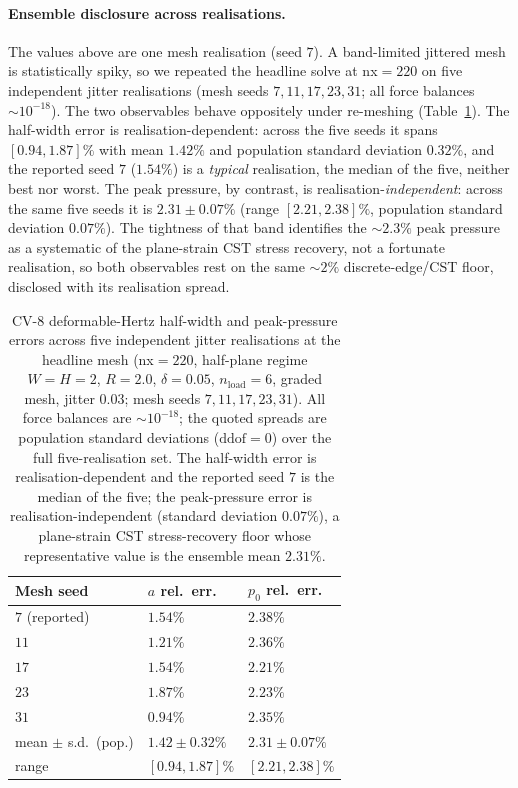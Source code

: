 \documentclass{svjour3}                 %
\begin{document}
\paragraph{Ensemble disclosure across realisations.} The values above are one mesh realisation (seed $7$). A
band-limited jittered mesh is statistically spiky, so we
repeated the headline solve at nx$=220$ on five independent jitter realisations (mesh seeds $7,11,17,23,31$; all
force balances $\sim\!10^{-18}$). The two observables behave oppositely under re-meshing
(Table~\ref{tab:cv8-ensemble}). The half-width error is realisation-dependent: across the five seeds it spans
$[0.94,1.87]\%$ with mean $1.42\%$ and population standard deviation $0.32\%$, and the reported seed $7$
($1.54\%$) is a \emph{typical} realisation, the median of the five, neither best nor worst. The peak pressure, by
contrast, is realisation-\emph{independent}: across the same five seeds it is $2.31\pm0.07\%$ (range
$[2.21,2.38]\%$, population standard deviation $0.07\%$). The tightness of that band identifies the $\sim\!2.3\%$
peak pressure as a systematic of the plane-strain CST stress recovery, not a fortunate realisation, so
both observables rest on the same $\sim\!2\%$ discrete-edge/CST floor, disclosed with its realisation spread.

\begin{table}[t]
  \centering
  \caption{CV-8 deformable-Hertz half-width and peak-pressure errors across five independent jitter realisations
  at the headline mesh (nx$=220$, half-plane regime $W{=}H{=}2$, $R=2.0$, $\delta=0.05$, $n_{\mathrm{load}}=6$,
  graded mesh, jitter $0.03$; mesh seeds $7,11,17,23,31$). All force balances are $\sim\!10^{-18}$; the quoted
  spreads are population standard deviations ($\mathrm{ddof}=0$) over the full five-realisation set. The
  half-width error is realisation-dependent and the reported seed $7$ is the median of the five; the peak-pressure
  error is realisation-independent (standard deviation $0.07\%$), a plane-strain CST stress-recovery
  floor whose representative value is the ensemble mean $2.31\%$.}
  \label{tab:cv8-ensemble}
  \small
  \begin{tabular}{@{}lll@{}}
    \toprule
    Mesh seed & $a$ rel.\ err.\ & $p_0$ rel.\ err.\ \\
    \midrule
    $7$ (reported)     & $\mathbf{1.54\%}$ & $\mathbf{2.38\%}$ \\
    $11$               & $1.21\%$          & $2.36\%$ \\
    $17$               & $1.54\%$          & $2.21\%$ \\
    $23$               & $1.87\%$          & $2.23\%$ \\
    $31$               & $0.94\%$          & $2.35\%$ \\
    \midrule
    mean $\pm$ s.d.\ (pop.)   & $1.42\pm0.32\%$   & $2.31\pm0.07\%$ \\
    range              & $[0.94,1.87]\%$   & $[2.21,2.38]\%$ \\
    \bottomrule
  \end{tabular}
\end{table}
\end{document}

